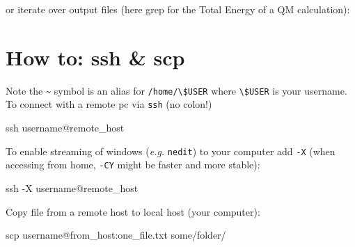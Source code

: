 \documentclass[
  letterpaper,
  DIV=11,
  numbers=noendperiod]{scrreprt}
\newenvironment{Shaded}{\begin{snugshade}}{\end{snugshade}}
\newcommand{\AttributeTok}[1]{\textcolor[rgb]{0.40,0.45,0.13}{#1}}
\newcommand{\ControlFlowTok}[1]{\textcolor[rgb]{0.00,0.23,0.31}{#1}}
\newcommand{\FunctionTok}[1]{\textcolor[rgb]{0.28,0.35,0.67}{#1}}
\newcommand{\KeywordTok}[1]{\textcolor[rgb]{0.00,0.23,0.31}{#1}}
\newcommand{\NormalTok}[1]{\textcolor[rgb]{0.00,0.23,0.31}{#1}}
\newcommand{\PreprocessorTok}[1]{\textcolor[rgb]{0.68,0.00,0.00}{#1}}
\newcommand{\StringTok}[1]{\textcolor[rgb]{0.13,0.47,0.30}{#1}}
\newcommand{\VariableTok}[1]{\textcolor[rgb]{0.07,0.07,0.07}{#1}}
\begin{document}
or iterate over output files (here grep for the Total Energy of a QM
calculation):

\begin{Shaded}
\end{Shaded}

\hypertarget{how-to-ssh-scp}{%
\chapter*{How to: ssh \& scp}\label{how-to-ssh-scp}}


Note the \texttt{\textasciitilde{}} symbol is an alias for
\texttt{/home/\textbackslash{}\$USER} where
\texttt{\textbackslash{}\$USER} is your username. To connect with a
remote pc via \texttt{ssh} (no colon!)

\begin{Shaded}
\begin{Highlighting}[]

\NormalTok{ssh username@remote\_host  }
\end{Highlighting}
\end{Shaded}

To enable streaming of windows (\emph{e.g.} \texttt{nedit}) to your
computer add \texttt{-X} (when accessing from home, \texttt{-CY} might
be faster and more stable):

\begin{Shaded}
\begin{Highlighting}[]
\FunctionTok{ssh} \AttributeTok{{-}X}\NormalTok{ username@remote\_host  }
\end{Highlighting}
\end{Shaded}

Copy file from a remote host to local host (your computer):

\begin{Shaded}
\begin{Highlighting}[]
\FunctionTok{scp}\NormalTok{   username@from\_host:one\_file.txt   some/folder/}
\end{Highlighting}
\end{Shaded}
\end{document}
